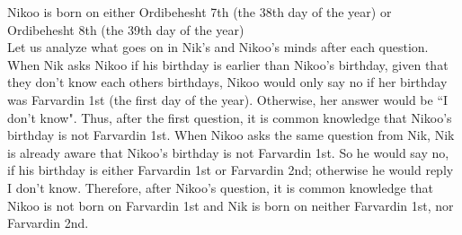 \begin{solution}
Nikoo is born on either Ordibehesht 7th (the 38th day of the year) or Ordibehesht 8th (the 39th day of the year) \\[0.2cm]

Let us analyze what goes on in Nik's and Nikoo's minds after each question. 
When Nik asks Nikoo if his birthday is earlier than Nikoo's birthday, given that they don't know each others birthdays, Nikoo would only say no if her birthday was Farvardin 1st (the first day of the year). Otherwise, her answer would be ``I don't know". Thus, after the first question, it is common knowledge that Nikoo's birthday is not Farvardin 1st. When Nikoo asks the same question from Nik, Nik is already aware that Nikoo's birthday is not Farvardin 1st. So he would say no, if his birthday is either Farvardin 1st or Farvardin 2nd; otherwise he would reply I don't know. Therefore, after Nikoo's question, it is common knowledge that Nikoo is not born on Farvardin 1st and Nik is born on neither Farvardin 1st, nor Farvardin 2nd.


\end{solution}
